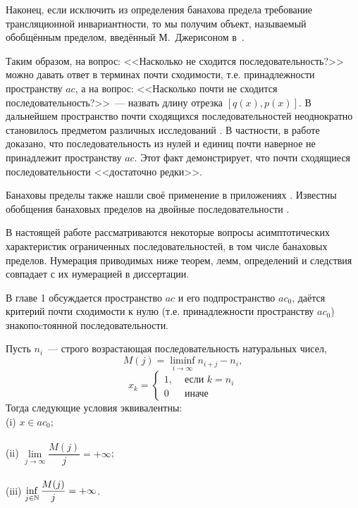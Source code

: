 Наконец, если исключить из определения банахова предела требование трансляционной инвариантности,
то мы получим объект, называемый обобщённым пределом, введённый М.~Джерисоном в~\cite{jerison1957set}.


Таким образом, на вопрос: <<Насколько не сходится последовательность?>> %
можно давать ответ в терминах почти сходимости, т.е. принадлежности пространству $ac$,
а на вопрос: <<Насколько почти не сходится последовательность?>>~---
назвать длину отрезка $[q(x), p(x)]$.
В дальнейшем пространство почти сходящихся последовательностей неоднократно становилось предметом
различных исследований
\cite{semenov2006space,usachev2008transformations}.
В частности, в работе~\cite{connor1990almost} доказано,
что последовательность из нулей и единиц почти наверное не принадлежит пространству $ac$.
Этот факт демонстрирует, что почти сходящиеся последовательности <<достаточно редки>>.


Банаховы пределы также нашли своё применение в приложениях
\cite{semenov2015banachtraces,semenov2009fourier,strukova2015spectres}.
Известны обобщения банаховых пределов на двойные последовательности
\cite{edely2004almost}.



В настоящей работе рассматриваются некоторые вопросы асимптотических характеристик ограниченных последовательностей,
в том числе банаховых пределов.
Нумерация приводимых ниже теорем, лемм, определений и следствия совпадает с их нумерацией в диссертации.


В главе 1 обсуждается пространство $ac$ и его подпространство $ac_0$,
даётся критерий почти сходимости к нулю (т.е. принадлежности пространству $ac_0$)
знакопоcтоянной последовательности.

	Пусть $n_i$~--- строго возрастающая последовательность натуральных чисел,
	\begin{equation}
		\label{eq:definition_M_j}
		M(j) = \liminf_{i\to\infty} n_{i+j} - n_i,
	\end{equation}
	\begin{equation}
		x_k = \left\{\begin{array}{ll}
			1, & \mbox{~если~} k = n_i
			\\
			0  & \mbox{~иначе~}
		\end{array}\right.
	\end{equation}
	Тогда следующие условия эквивалентны:
	\\
	(i)   $x \in ac_0$;
	\\\\
	(ii)  $\lim\limits_{j \to \infty} \dfrac{M(j)}{j} = +\infty$;
	\\\\
	(iii) $\inf\limits_{j \in \mathbb{N}}     \dfrac{M(j)}{j} = +\infty$.


